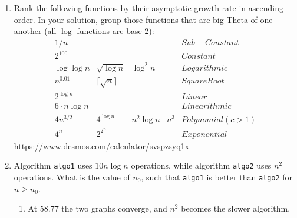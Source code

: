 \documentclass[11pt]{article}
\begin{document}
    \begin{enumerate}[leftmargin=*]
    
        \item Rank the following functions by their asymptotic growth rate in ascending order.  In your solution, group those functions that are big-Theta of one another (all $\log$ functions are base 2):
        \begin{equation*}
            \begin{array}{ccccc}
                1/n & & & & Sub-Constant \\
                2^{100} & & & & Constant \\
                \log \log n & \sqrt{\log n} & \log^2 n & & Logarithmic \\
                n^{0.01} & \lceil\sqrt{n}\rceil & & & Square Root \\
                2^{\log n} & & & & Linear \\
                6 \cdot n\log n & & & & Linearithmic \\
                4n^{3/2} & 4^{\log n} & n^2\log n & n^3 & Polynomial (c>1) \\
                4^n & 2^{2^n} & & & Exponential
            \end{array}           
        \end{equation*}
        https://www.desmos.com/calculator/svspzsyq1x
    
        \item Algorithm \verb|algo1| uses $10n\log n$ operations, while algorithm \verb|algo2| uses $n^2$ operations.  What is the value of $n_0$, such that \verb|algo1| is better than \verb|algo2| for $n\ge n_0$.
        \begin{enumerate}
            \item At 58.77 the two graphs converge, and $n^2$ becomes the slower algorithm.
        \end{enumerate}
    

\end{enumerate}
\end{document}
